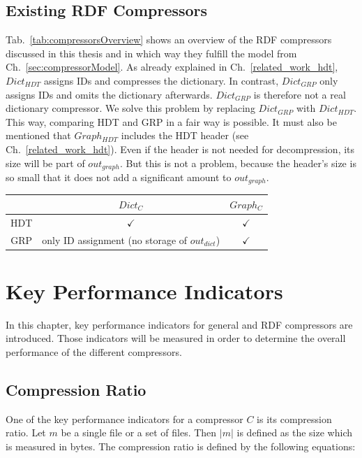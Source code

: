 \subsection{Existing RDF  Compressors}

Tab.~\ref{tab:compressorsOverview} shows an overview of the RDF compressors discussed in this thesis and in which way they fulfill the model from Ch.~\ref{sec:compressorModel}. As already explained in Ch.~\ref{related_work_hdt}, $Dict_{HDT}$ assigns IDs and compresses the dictionary. In contrast, $Dict_{GRP}$  only assigns IDs and omits the dictionary afterwards. $Dict_{GRP}$ is therefore not a real dictionary compressor. We solve this problem by replacing  $Dict_{GRP}$ with $Dict_{HDT}$. This way, comparing HDT and GRP in a fair way is possible. It must also be mentioned that $Graph_{HDT}$ includes the HDT header (see Ch.~\ref{related_work_hdt}). Even if the header is not needed for decompression, its size will be part of $out_{graph}$. But this is not a problem, because the header's size is so small that it does not add a significant amount to $out_{graph}$.

\begin{center}
	\begin{tabular}{|c|c|c|}
		\hline 
		& $Dict_{C}$ & $Graph_{C}$ \\ 
		\hline \hline
		HDT & $\checkmark$ & $\checkmark$  \\ 
		\hline 
		GRP & only ID assignment (no storage of $out_{dict}$) & $\checkmark$ \\ 
		\hline 
	\end{tabular} 
	\label{tab:compressorsOverview}
\end{center}

\section{Key Performance Indicators}

In this chapter, key performance indicators for general and RDF compressors are introduced. Those indicators will be measured in order to determine the overall performance of the different compressors.

\subsection{Compression Ratio}

One of the key performance indicators for a compressor $C$ is its compression ratio. Let $m$ be a single file or a set of files. Then $|m|$ is defined as the size which is measured in bytes. The compression ratio is defined by the following equations:

